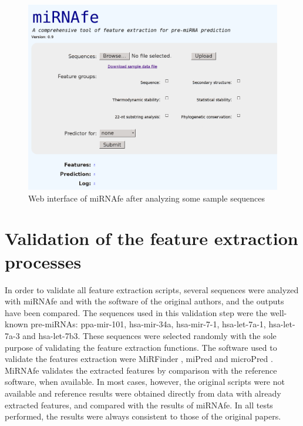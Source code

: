 \documentclass{article}
\begin{document}
\begin{figure}[tb]
 \centering
 \includegraphics[width=\textwidth]{screenshot.png}
 \caption{Web interface of miRNAfe after analyzing some sample sequences}
 \label{fig:screenshot}
\end{figure}

\section{Validation of the feature extraction processes}
In order to validate all feature extraction scripts, several sequences were analyzed with miRNAfe and with the software of the original authors, and the 
outputs have been compared. The sequences used in this validation step were the well-known pre-miRNAs: ppa-mir-101, hsa-mir-34a, hsa-mir-7-1, hsa-let-7a-1, 
hsa-let-7a-3 and hsa-let-7b3. These sequences were selected randomly with the sole purpose of validating the feature extraction functions. The software used to 
validate the features extraction were MiRFinder \citep{Huang07}, miPred \citep{Jiang07} and microPred \citep{Rukshan09}. MiRNAfe validates the extracted 
features by comparison with the reference software, when available. In most cases, however, the original scripts were not available and reference results were 
obtained directly from data with already extracted features, and compared with the results of miRNAfe. In all tests performed, the results were always 
consistent to those of the original papers. 
\end{document}
